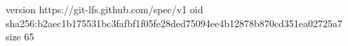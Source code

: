 version https://git-lfs.github.com/spec/v1
oid sha256:b2aec1b175531bc3fafbf1f05fe28ded75094ee4b12878b870cd351ea02725a7
size 65
